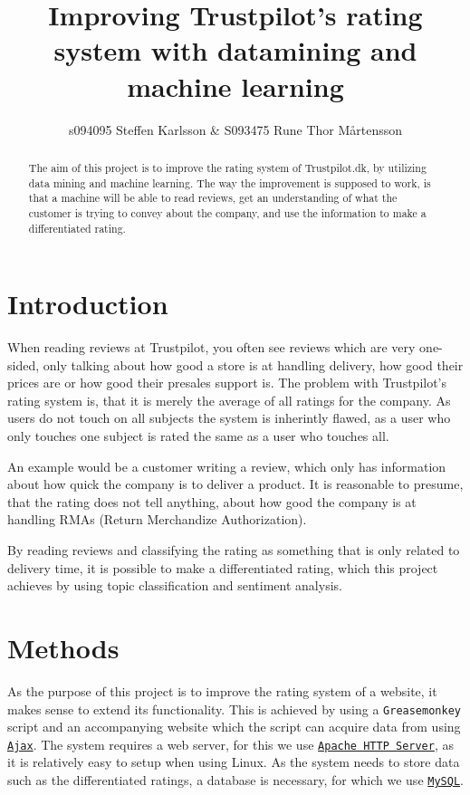 \documentclass[10pt]{IEEEtran}
\title{Improving Trustpilot's rating system with datamining and machine learning}
\author{s094095 Steffen Karlsson \& S093475 Rune Thor Mårtensson}
\begin{document}
\maketitle

\begin{abstract}
The aim of this project is to improve the rating system of Trustpilot.dk, by utilizing data mining and machine learning. The way the improvement is supposed to work, is that a machine will be able to read reviews, get an understanding of what the customer is trying to convey about the company, and use the information to make a differentiated rating.
\end{abstract}

\section{Introduction}
When reading reviews at Trustpilot, you often see reviews which are very one-sided, only talking about how good a store is at handling delivery, how good their prices are or how good their presales support is. The problem with Trustpilot's rating system is, that it is merely the average of all ratings for the company. As users do not touch on all subjects the system is inherintly flawed, as a user who only touches one subject is rated the same as a user who touches all.

An example would be a customer writing a review, which only has information about how quick the company is to deliver a product. It is reasonable to presume, that the rating does not tell anything, about how good the company is at handling RMAs (Return Merchandize Authorization). 

By reading reviews and classifying the rating as something that is only related to delivery time, it is possible to make a differentiated rating, which this project achieves by using topic classification and sentiment analysis.

\section{Methods}
As the purpose of this project is to improve the rating system of a website, it makes sense to extend its functionality. This is achieved by using a \texttt{Greasemonkey}\cite{GreaseMonkey} script and an accompanying website which the script can acquire data from using \href{http://en.wikipedia.org/wiki/Ajax_(programming)}{\texttt{Ajax}}.
The system requires a web server, for this we use \href{http://httpd.apache.org/}{\texttt{Apache HTTP Server}}, as it is relatively easy to setup when using Linux. As the system needs to store data such as the differentiated ratings, a database is necessary, for which we use \href{http://www.mysql.com/}{\texttt{MySQL}}.
\end{document}
